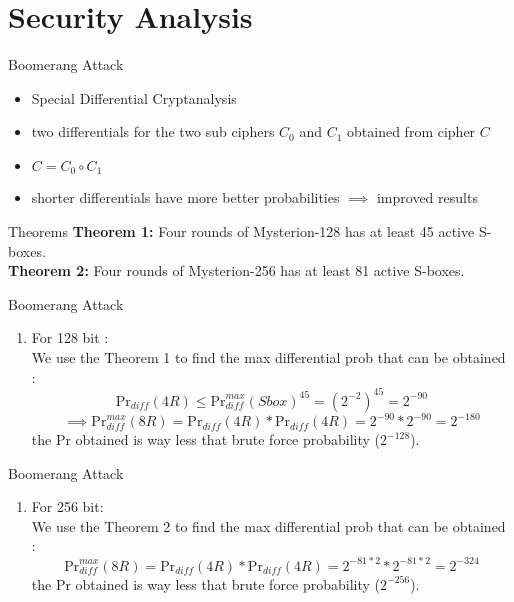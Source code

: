 \section{Security Analysis}

\begin{frame}{Boomerang Attack}
\begin{itemize}
    \item Special Differential Cryptanalysis
    \item two differentials for the two sub ciphers $C_0$ and $C_1$ obtained from cipher $C$ 
    \item $C=C_{0} \circ C_{1}$
    \item shorter differentials have more better probabilities $\implies$ improved results 
\end{itemize}
\begin{block}{Theorems}
\textbf{Theorem 1:}  Four rounds of Mysterion-128 has at least 45 active S-boxes.  \\
\textbf{Theorem 2:} Four rounds of Mysterion-256 has at least 81 active S-boxes. \\
\end{block}

\end{frame}

\begin{frame}{Boomerang Attack}
\begin{enumerate}
    \item For 128 bit : \\
    We use the Theorem 1  to find the max differential prob that can be obtained : 
    $$\text{Pr}_{diff}(4R) \leq \text{Pr}_{diff}^{max}(Sbox)^{45} = (2^{-2})^{45} = 2^{-90} $$
    $$\implies \text{Pr}_{diff}^{max}(8R) = \text{Pr}_{diff}(4R) *\text{Pr}_{diff}(4R)  = 2^{-90}*2^{-90} = 2^{-180}  
    $$
    the Pr obtained is way less that  brute force probability ($2^{-128}$). \\
    
\end{enumerate}
\end{frame}

\begin{frame}{Boomerang Attack}
    \begin{enumerate}
        \item For 256 bit: \\
    We use the Theorem 2  to find the max differential prob that can be obtained : 
    $$\text{Pr}_{diff}^{max}(8R) = \text{Pr}_{diff}(4R) *\text{Pr}_{diff}(4R)  = 2^{-81*2}*2^{-81*2} = 2^{-324} 
    $$
    the Pr obtained is way less that  brute force probability ($2^{-256}$). \\
    \end{enumerate}
\end{frame}

